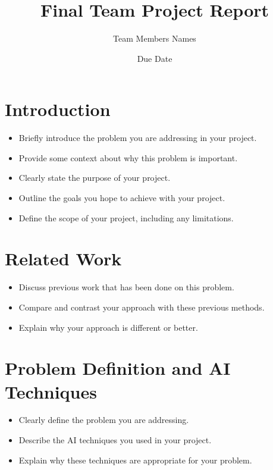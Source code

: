 \documentclass{article}
\title{Final Team Project Report}
\author{Team Members Names}
\date{Due Date}
\begin{document}


\maketitle

\section{Introduction}

\label{sec:introduction}
\begin{itemize}
    \item Briefly introduce the problem you are addressing in your project.
    \item Provide some context about why this problem is important.
    \item Clearly state the purpose of your project.
    \item Outline the goals you hope to achieve with your project.
    \item Define the scope of your project, including any limitations.
\end{itemize}

\section{Related Work}
\label{sec:related_work}
\begin{itemize}
    \item Discuss previous work that has been done on this problem.
    \item Compare and contrast your approach with these previous methods.
    \item Explain why your approach is different or better.
\end{itemize}

\section{Problem Definition and AI Techniques}
\label{sec:problem_definition_and_ai_techniques}
\begin{itemize}
    \item Clearly define the problem you are addressing.
    \item Describe the AI techniques you used in your project.
    \item Explain why these techniques are appropriate for your problem.
\end{itemize}
\end{document}
